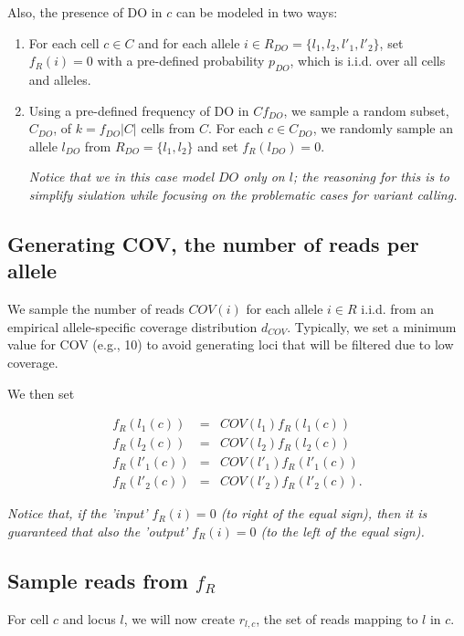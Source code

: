 \documentclass[a4paper,11pt]{article}
\begin{document}
Also, the presence of DO in $c$ can be modeled in two ways:
\begin{enumerate}
\item For each cell $c \in C$ and for each allele $i\in R_{DO} = \{l_1,l_2, l'_1, l'_2\}$, set
  $f_R(i)=0$ with a pre-defined probability $p_{DO}$, which is
  i.i.d. over all cells and alleles.
\item Using a pre-defined frequency of DO in
  $C$$f_{DO}$, we sample a random subset, $C_{DO}$, of
  $k=f_{DO}|C|$ cells from $C$. For each $c\in
  C_{DO}$, we randomly sample an allele
  $l_{DO}$ from $R_{DO}=\{l_1,l_2\}$ and set
  $f_R(l_{DO})=0$.

  \emph{Notice that we in this case model $DO$ only on
    $l$; the reasoning for this is to simplify siulation while focusing
    on the problematic cases for variant calling.}
\end{enumerate}


\subsection{Generating COV, the number of reads per allele}
\label{sec:gener-numb-reads}


We sample the number of reads $COV(i)$ for each allele $i\in R$
i.i.d. from an empirical allele-specific coverage distribution
$d_{COV}$. Typically, we set a minimum value for COV (e.g., 10) to
avoid generating loci that will be filtered due to low coverage.

We then set

\begin{eqnarray*}
  f_R(l_1(c)) &=& COV(l_1) f_R(l_1(c))\\
  f_R(l_2(c)) &=& COV(l_2) f_R(l_2(c))\\
  f_R(l'_1(c)) &=& COV(l'_1) f_R(l'_1(c))\\
  f_R(l'_2(c)) &=& COV(l'_2) f_R(l'_2(c)).
\end{eqnarray*}

\emph{Notice that, if the 'input' $f_R(i)=0$ (to right of the equal sign), then it is guaranteed that also the 'output' $f_R(i)=0$ (to the left of the equal sign).}

\subsection{Sample reads from $f_R$}
\label{sec:sample-reads-from}
For cell $c$ and locus $l$, we will now create $r_{l,c}$, the set of
reads mapping to $l$ in $c$.
\end{document}

